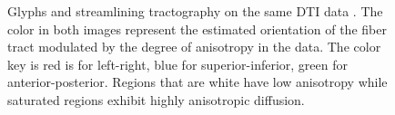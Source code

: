\begin{figure}
	\caption{Glyphs and streamlining tractography on the same DTI data \cite{KindlmannTVCG2006}. The color in both images represent the estimated orientation of the fiber tract modulated by the degree of anisotropy in the data.  The color key is red is for left-right, blue for superior-inferior, green for anterior-posterior.  Regions that are white have low anisotropy while saturated regions exhibit highly anisotropic diffusion.}
  \label{fig:visualization}
\end{figure}

